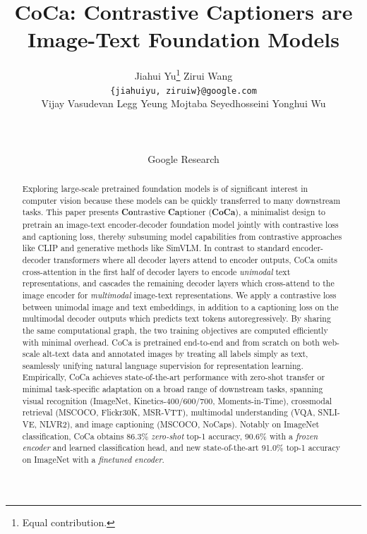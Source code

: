 \documentclass{article}
\title{CoCa: Contrastive Captioners are Image-Text Foundation Models}
\author{
\parbox{\linewidth}{\centering
   Jiahui Yu\thanks{Equal contribution.} \hspace{1cm}
   Zirui Wang\footnotemark[2] \hspace{1cm}\\\vspace{0.1cm}
   \texttt{\{jiahuiyu, ziruiw\}@google.com}\\\vspace{0.2cm}
   Vijay Vasudevan \hspace{.1cm}
   Legg Yeung \hspace{.1cm}
   Mojtaba Seyedhosseini \hspace{.1cm}
   Yonghui Wu  \hspace{.1cm}\\
}\\

\parbox{\linewidth}{\centering \vspace{0.2cm}
   Google Research \\
}
}
\begin{document}
\maketitle

\begin{abstract}
Exploring large-scale pretrained foundation models is of significant interest in computer vision because these models can be quickly transferred to many downstream tasks. This paper presents \textbf{Co}ntrastive \textbf{Ca}ptioner (\textbf{CoCa}), a minimalist design to pretrain an image-text encoder-decoder foundation model jointly with contrastive loss and captioning loss, thereby subsuming model capabilities from contrastive approaches like CLIP and generative methods like SimVLM. In contrast to standard encoder-decoder transformers where all decoder layers attend to encoder outputs, CoCa omits cross-attention in the first half of decoder layers to encode \textit{unimodal} text representations, and cascades the remaining decoder layers which cross-attend to the image encoder for \textit{multimodal} image-text representations. We apply a contrastive loss between unimodal image and text embeddings, in addition to a captioning loss on the multimodal decoder outputs which predicts text tokens autoregressively. By sharing the same computational graph, the two training objectives are computed efficiently with minimal overhead. CoCa is pretrained end-to-end and from scratch on both web-scale alt-text data and annotated images by treating all labels simply as text, seamlessly unifying natural language supervision for representation learning. Empirically, CoCa achieves state-of-the-art performance with zero-shot transfer or minimal task-specific adaptation on a broad range of downstream tasks, spanning visual recognition (ImageNet, Kinetics-400/600/700, Moments-in-Time), crossmodal retrieval (MSCOCO, Flickr30K, MSR-VTT), multimodal understanding (VQA, SNLI-VE, NLVR2), and image captioning (MSCOCO, NoCaps). Notably on ImageNet classification, CoCa obtains 86.3\% \textit{zero-shot} top-1 accuracy, 90.6\% with a \textit{frozen encoder} and learned classification head, and new state-of-the-art 91.0\% top-1 accuracy on ImageNet with a \textit{finetuned encoder}.
\end{abstract}








\end{document}
